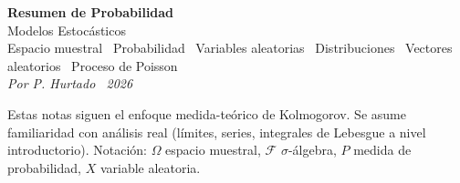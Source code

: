 \documentclass[10pt,a4paper]{article}
\numberwithin{equation}{section}
\newcommand{\sigalg}{\mathcal{F}}
\newenvironment{nota}{\begin{tcolorbox}[notebox]}{\end{tcolorbox}}
\begin{document}

\begin{tcolorbox}[
    colback=sectionbg, colupper=white, colframe=sectionbg,
    sharp corners, left=12pt, right=12pt, top=10pt, bottom=10pt,
  ]
  {\Large\bfseries\sffamily Resumen de Probabilidad}\\[4pt]
  {\normalsize\sffamily Modelos Estoc\'asticos}\\[6pt]
  {\small\sffamily\color{white!80!sectionbg}
    Espacio muestral \textperiodcentered\ Probabilidad \textperiodcentered\ Variables aleatorias \textperiodcentered\
    Distribuciones \textperiodcentered\ Vectores aleatorios \textperiodcentered\ Proceso de Poisson}\\[6pt]
  {\footnotesize\sffamily\color{white!85!sectionbg}\itshape
    Por P. Hurtado \textperiodcentered\ 2026}
\end{tcolorbox}

\vspace{4pt}
\begin{nota}
  Estas notas siguen el enfoque medida-te\'orico de Kolmogorov. Se asume familiaridad con
  an\'alisis real (l\'imites, series, integrales de Lebesgue a nivel introductorio).
  Notaci\'on: $\Omega$ espacio muestral, $\sigalg$ $\sigma$-\'algebra, $P$ medida de probabilidad,
  $X$ variable aleatoria.
\end{nota}

\tableofcontents
\end{document}
